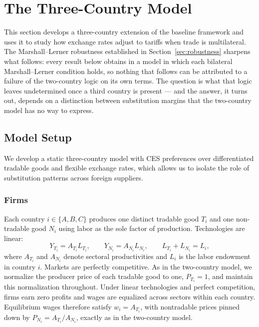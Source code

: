 \documentclass[11pt]{article}
\theoremstyle{plain}
\theoremstyle{remark}
\numberwithin{lemma}{section}
\numberwithin{proposition}{section}
\numberwithin{corollary}{section}
\newcommand{\rev}[1]{{\color{RevBlue}#1}}
\begin{document}
\section{The Three-Country Model}
\label{sec:threecountry}

This section develops a three-country extension of the baseline framework and uses it to study how exchange rates adjust to tariffs when trade is multilateral. \rev{The Marshall--Lerner robustness established in Section~\ref{sec:robustness} sharpens what follows: every result below obtains in a model in which each bilateral Marshall--Lerner condition holds, so nothing that follows can be attributed to a failure of the two-country logic on its own terms. The question is what that logic leaves undetermined once a third country is present --- and the answer, it turns out, depends on a distinction between substitution margins that the two-country model has no way to express.}

\subsection{Model Setup}

We develop a static three-country model with CES preferences over differentiated tradable goods and flexible exchange rates, which allows us to isolate the role of substitution patterns across foreign suppliers.

\subsubsection{Firms}

Each country $i \in \{A,B,C\}$ produces one distinct tradable good $T_i$ and one non-tradable good $N_i$ using labor as the sole factor of production. Technologies are linear:
\begin{equation}
Y_{T_i} = A_{T_i} L_{T_i}, \qquad Y_{N_i} = A_{N_i} L_{N_i}, \qquad L_{T_i} + L_{N_i} = L_i,
\end{equation}
where $A_{T_i}$ and $A_{N_i}$ denote sectoral productivities and $L_i$ is the labor endowment in country $i$. Markets are perfectly competitive. As in the two-country model, we normalize the producer price of each tradable good to one, $P_{T_i} = 1$, and maintain this normalization throughout. Under linear technologies and perfect competition, firms earn zero profits and wages are equalized across sectors within each country. Equilibrium wages therefore satisfy $w_i = A_{T_i}$, with nontradable prices pinned down by $P_{N_i} = A_{T_i}/A_{N_i}$, exactly as in the two-country model.
\end{document}
